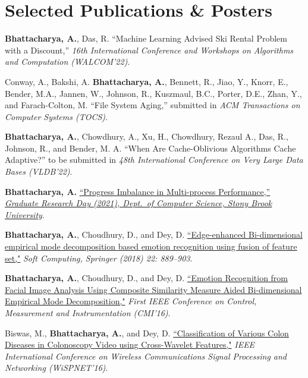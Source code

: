 \documentclass[letterpaper,10pt]{article}
\begin{document}
\section{Selected Publications \& Posters}
\label{sec:pubs}
\resumeSubHeadingListStart
\item{\textbf{Bhattacharya, A.}, Das, R. {``Machine Learning Advised Ski Rental Problem with a Discount,''} \textit{16th International Conference and Workshops on Algorithms and Computation (WALCOM'22)}.}
\item {Conway, A., Bakshi, A. \textbf{Bhattacharya, A.}, Bennett, R., Jiao, Y., Knorr, E., Bender, M.A., Jannen, W., Johnson, R., Kuszmaul, B.C., Porter, D.E., Zhan, Y., and Farach-Colton, M. {``File System Aging,''} submitted in \textit{ACM Transactions on Computer Systems (TOCS)}.}
\item {\textbf{Bhattacharya, A.}, Chowdhury, A., Xu, H., Chowdhury, Rezaul A., Das, R., Johnson, R., and Bender, M. A. {``When Are Cache-Oblivious Algorithms Cache Adaptive?''} to be submitted in \textit{48th International Conference on Very Large Data Bases (VLDB'22)}.}
\item {\textbf{Bhattacharya, A.}
\href{https://www3.cs.stonybrook.edu/~grd/posters/GRD_2021_Poster_Arghya_Bhattacharya.pdf}{``Progress Imbalance in Multi-process Performance,''} \href{https://www3.cs.stonybrook.edu/~grd/index.html}{\textit{Graduate Research Day (2021), Dept.\ of Computer Science, Stony Brook University}}.}
\item {\textbf{Bhattacharya, A.}, Choudhury, D., and Dey, D. \href{https://doi.org/10.1007/s00500-016-2395-4}{``Edge-enhanced Bi-dimensional empirical mode decomposition based emotion recognition using fusion of feature set,"} \textit{Soft Computing, Springer (2018) 22: 889--903}.}
\item {\textbf{Bhattacharya, A.}, Choudhury, D., and Dey, D. \href{https://doi.org/10.1109/CMI.2016.7413766}{``Emotion Recognition from Facial Image Analysis Using Composite Similarity Measure Aided Bi-dimensional Empirical Mode Decomposition,"} \textit{First IEEE Conference on Control, Measurement and Instrumentation (CMI’16)}.}
\item {Biswas, M., \textbf{Bhattacharya, A.}, and Dey, D. \href{https://doi.org/10.1109/WiSPNET.2016.7566521} {``Classification of Various Colon Diseases in Colonoscopy Video using Cross-Wavelet Features,"} \textit{IEEE International Conference on Wireless Communications Signal Processing and Networking (WiSPNET'16)}.}
\resumeSubHeadingListEnd
\end{document}

